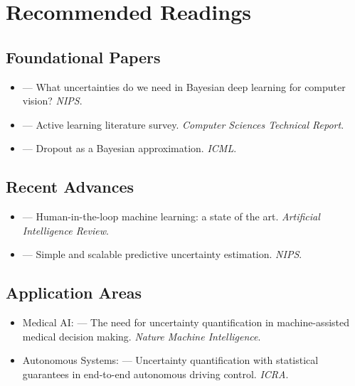 \section{Recommended Readings}

\subsection{Foundational Papers}
\begin{itemize}
    \item \textcite{kendall2017uncertainties} --- What uncertainties do we need in Bayesian deep learning for computer vision? \emph{NIPS}.
    \item \textcite{settles2009active} --- Active learning literature survey. \emph{Computer Sciences Technical Report}.
    \item \textcite{gal2016dropout} --- Dropout as a Bayesian approximation. \emph{ICML}.
\end{itemize}

\subsection{Recent Advances}
\begin{itemize}
    \item \textcite{mosqueira2023hitl} --- Human-in-the-loop machine learning: a state of the art. \emph{Artificial Intelligence Review}.
    \item \textcite{lakshminarayanan2017simple} --- Simple and scalable predictive uncertainty estimation. \emph{NIPS}.
\end{itemize}

\subsection{Application Areas}
\begin{itemize}
    \item Medical AI: \textcite{begoli2019uncertainty} --- The need for uncertainty quantification in machine-assisted medical decision making. \emph{Nature Machine Intelligence}.
    \item Autonomous Systems: \textcite{michelmore2020uncertainty} --- Uncertainty quantification with statistical guarantees in end-to-end autonomous driving control. \emph{ICRA}.
\end{itemize}

